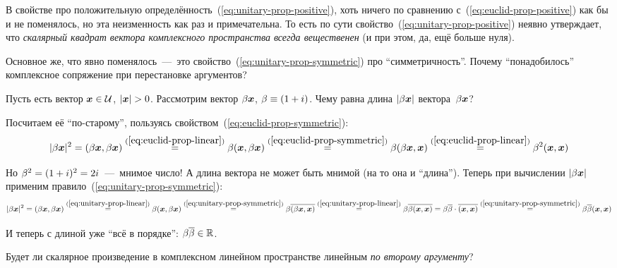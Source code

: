\documentclass[a4paper,12pt]{article}
\begin{document}
  В свойстве про положительную определённость~(\ref{eq:unitary-prop-positive}), хоть ничего по сравнению с~(\ref{eq:euclid-prop-positive}) как бы и не поменялось, но эта неизменность как раз и примечательна.
  То есть по сути свойство~(\ref{eq:unitary-prop-positive}) неявно утверждает, что \emph{скалярный квадрат вектора комплексного пространства всегда вещественен} (и при этом, да, ещё больше нуля).
  
  Основное же, что явно поменялось~---~это свойство~(\ref{eq:unitary-prop-symmetric}) про ``симметричность''.
  Почему ``понадобилось'' комплексное сопряжение при перестановке аргументов?
  
  \begin{example}
    Пусть есть вектор $\bds x \hm\in \mathcal U$, $|\bds x| \hm> 0$.
    Рассмотрим вектор $\beta \boldsymbol x$, $\beta \hm\equiv (1 \hm+ i)$.
    Чему равна длина $|\beta \boldsymbol x|$ вектора~$\beta \boldsymbol x$?
    
    Посчитаем её ``по-старому'', пользуясь свойством~(\ref{eq:euclid-prop-symmetric}):
    \[
      |\beta \boldsymbol x|^2 = (\beta \boldsymbol x, \beta \boldsymbol x)
      \overset{(\ref{eq:euclid-prop-linear})}{=} \beta (\boldsymbol x, \beta \boldsymbol x)
      \overset{(\ref{eq:euclid-prop-symmetric})}{=} \beta (\beta \boldsymbol x, \boldsymbol x)
      \overset{(\ref{eq:euclid-prop-linear})}{=} \beta^2 (\boldsymbol x, \boldsymbol x)
    \]
    
    Но $\beta^2 \hm= (1 \hm+ i)^2 \hm= 2i$~---~мнимое число!
    А длина вектора не может быть мнимой (на то она и ``длина'').
    Теперь при вычислении $|\beta \boldsymbol x|$ применим правило~(\ref{eq:unitary-prop-symmetric}):
    \[
      |\beta \boldsymbol x|^2 = (\beta \boldsymbol x, \beta \boldsymbol x)
      \overset{(\ref{eq:unitary-prop-linear})}{=} \beta (\boldsymbol x, \beta \boldsymbol x)
      \overset{(\ref{eq:unitary-prop-symmetric})}{=} \beta \overline{(\beta \boldsymbol x, \boldsymbol x)}
      \overset{(\ref{eq:unitary-prop-linear})}{=} \beta \overline{\beta (\boldsymbol x, \boldsymbol x)}
      = \beta \overline{\beta} \cdot \overline{(\boldsymbol x, \boldsymbol x)}
      \overset{(\ref{eq:unitary-prop-symmetric})}{=} \beta \overline{\beta} (\boldsymbol x, \boldsymbol x)
    \]
    
    И теперь с длиной уже ``всё в порядке'': $\beta \overline{\beta} \hm\in \RR$.
  \end{example}
  
  \begin{exercise}
    Будет ли скалярное произведение в комплексном линейном пространстве линейным \emph{по второму аргументу}?
  \end{exercise}
  
\end{document}

